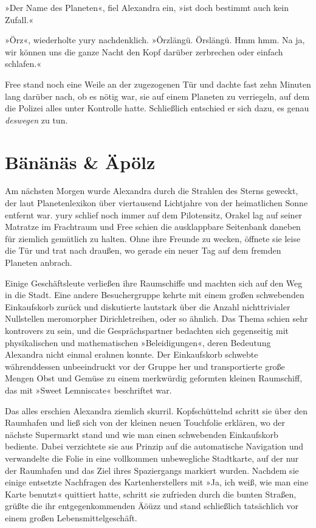 »Der Name des Planeten«, fiel Alexandra ein, »ist doch bestimmt auch kein Zufall.«

»Örz«, wiederholte yury nachdenklich. »Örzlängü. Örslängü. Hmm hmm. Na ja, wir können uns die ganze Nacht den Kopf darüber zerbrechen oder einfach schlafen.«

Free stand noch eine Weile an der zugezogenen Tür und dachte fast zehn Minuten lang darüber nach, ob es nötig war, sie auf einem Planeten zu verriegeln, auf dem die Polizei alles unter Kontrolle hatte. Schließlich entschied er sich dazu, es genau \emph{deswegen} zu tun.

\cleardoubleevenpage



\chapter{Bänänäs \& Äpölz}

Am nächsten Morgen wurde Alexandra durch die Strahlen des Sterns geweckt, der laut Planetenlexikon über viertausend Lichtjahre von der heimatlichen Sonne entfernt war. yury schlief noch immer auf dem Pilotensitz, Orakel lag auf seiner Matratze im Frachtraum und Free schien die ausklappbare Seitenbank daneben für ziemlich gemütlich zu halten. Ohne ihre Freunde zu wecken, öffnete sie leise die Tür und trat nach draußen, wo gerade ein neuer Tag auf dem fremden Planeten anbrach.

Einige Geschäftsleute verließen ihre Raumschiffe und machten sich auf den Weg in die Stadt. Eine andere Besuchergruppe kehrte mit einem großen schwebenden Einkaufskorb zurück und diskutierte lautstark über die Anzahl nichttrivialer Nullstellen meromorpher Dirichletreihen, oder so ähnlich. Das Thema schien sehr kontrovers zu sein, und die Gesprächspartner bedachten sich gegenseitig mit physikalischen und mathematischen »Beleidigungen«, deren Bedeutung Alexandra nicht einmal erahnen konnte. Der Einkaufskorb schwebte währenddessen unbeeindruckt vor der Gruppe her und transportierte große Mengen Obst und Gemüse zu einem merkwürdig geformten kleinen Raumschiff, das mit »Sweet Lemniscate« beschriftet war.

Das alles erschien Alexandra ziemlich skurril. Kopfschüttelnd schritt sie über den Raumhafen und ließ sich von der kleinen neuen Touchfolie erklären, wo der nächste Supermarkt stand und wie man einen schwebenden Einkaufskorb bediente. Dabei verzichtete sie aus Prinzip auf die automatische Navigation und verwandelte die Folie in eine vollkommen unbewegliche Stadtkarte, auf der nur der Raumhafen und das Ziel ihres Spaziergangs markiert wurden. Nachdem sie einige entsetzte Nachfragen des Kartenherstellers mit »Ja, ich weiß, wie man eine Karte benutzt« quittiert hatte, schritt sie zufrieden durch die bunten Straßen, grüßte die ihr entgegenkommenden Äöüzz und stand schließlich tatsächlich vor einem großen Lebensmittelgeschäft.

